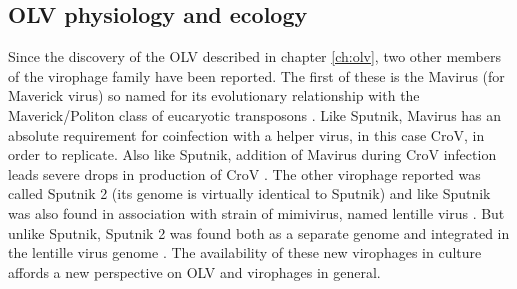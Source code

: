 
\subsection{\acs{OLV} physiology and ecology}
Since the discovery of the \ac{OLV} described in chapter \ref{ch:olv}, two other members of the virophage family have been reported.
The first of these is the Mavirus (for Maverick virus) so named for its evolutionary relationship with the Maverick/Politon class of eucaryotic transposons \cite{Fischer2011}.
Like Sputnik, Mavirus has an absolute requirement for coinfection with a helper virus, in this case \ac{CroV}, in order to replicate.
Also like Sputnik, addition of Mavirus during \ac{CroV} infection leads severe drops in production of \ac{CroV} \cite{Fischer2011}.
The other virophage reported was called Sputnik 2 (its genome is virtually identical to Sputnik) and like Sputnik was also found in association with strain of mimivirus, named lentille virus \cite{Desnues2012}.
But unlike Sputnik, Sputnik 2 was found both as a separate genome and integrated in the lentille virus genome \cite{Desnues2012}.
The availability of these new virophages in culture affords a new perspective on \ac{OLV} and virophages in general.


